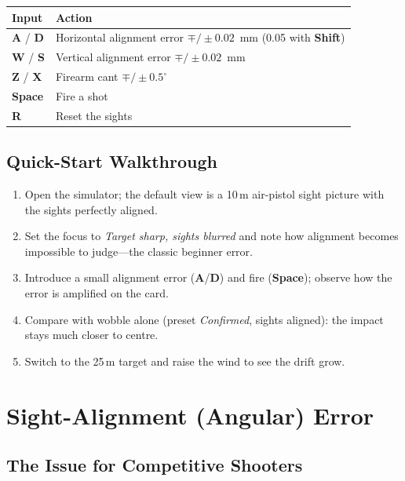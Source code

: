 \documentclass[11pt]{article}
\newcommand{\key}[1]{\textsf{\textbf{#1}}}
\begin{document}
\begin{center}
\begin{tabular}{ll}
\toprule
\textbf{Input} & \textbf{Action}\\
\midrule
\key{A} / \key{D} & Horizontal alignment error $\mp/\pm 0.02$~mm (0.05 with \key{Shift})\\
\key{W} / \key{S} & Vertical alignment error $\mp/\pm 0.02$~mm\\
\key{Z} / \key{X} & Firearm cant $\mp/\pm 0.5^\circ$\\
\key{Space} & Fire a shot\\
\key{R} & Reset the sights\\
\bottomrule
\end{tabular}
\end{center}

\subsection{Quick-Start Walkthrough}\label{sec:quickstart}

\begin{enumerate}[nosep]
  \item Open the simulator; the default view is a 10\,m air-pistol sight
        picture with the sights perfectly aligned.
  \item Set the focus to \emph{Target sharp, sights blurred} and note how
        alignment becomes impossible to judge---the classic beginner error.
  \item Introduce a small alignment error (\key{A}/\key{D}) and fire
        (\key{Space}); observe how the error is amplified on the card.
  \item Compare with wobble alone (preset \emph{Confirmed}, sights aligned):
        the impact stays much closer to centre.
  \item Switch to the 25\,m target and raise the wind to see the drift grow.
\end{enumerate}

\section{Sight-Alignment (Angular) Error}\label{sec:align}

\subsection{The Issue for Competitive Shooters}
\end{document}

